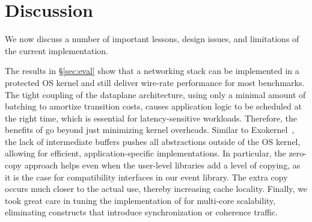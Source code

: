 
\section{Discussion}
\label{sec:disc}

We now discuss a number of important lessons, design issues, and
limitations of the current \ix implementation.

 The results in \S\ref{sec:eval}
show that a networking stack can be implemented in a protected OS
kernel and still deliver wire-rate performance for most benchmarks.
The tight coupling of the dataplane architecture, using only a minimal
amount of batching to amortize transition costs, causes application
logic to be scheduled at the right time, which is essential for
latency-sensitive workloads.  Therefore, the benefits of \ix go beyond
just minimizing kernel overheads. Similar to
Exokernel~\cite{DBLP:conf/sosp/EnglerKO95}, the lack of intermediate
buffers pushes all abstractions outside of the OS kernel, allowing for
efficient, application-specific implementations.  In particular, the
zero-copy approach helps even when the user-level libraries add a
level of copying, as it is the case for compatibility interfaces in
our event library.  The extra copy occurs much closer to the actual
use, thereby increasing cache locality.  Finally, we took great care
in tuning the implementation of \ix for multi-core scalability,
eliminating constructs that introduce synchronization or coherence
traffic.


